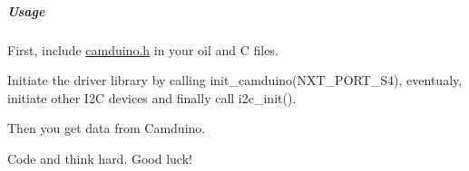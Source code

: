 \subparagraph*{Usage}


\begin{DoxyItemize}
\item First, include {\ttfamily \hyperlink{camduino_8h}{camduino.\+h}} in your oil and C files.
\item Initiate the driver library by calling {\ttfamily init\+\_\+camduino(\+N\+X\+T\+\_\+\+P\+O\+R\+T\+\_\+\+S4)}, eventualy, initiate other I2\+C devices and finally call {\ttfamily i2c\+\_\+init()}.
\item Then you get data from {\ttfamily Camduino}.
\item Code and think hard. Good luck! 
\end{DoxyItemize}